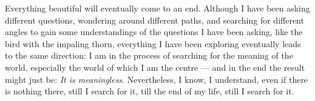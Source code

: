 \begin{center}
\vspace{-0.7em}
\vspace{-0.3em}
\end{center}

Everything beautiful will eventually come to an end. Although I have been asking different questions, wondering around different paths, and searching for different angles to gain some understandings of the questions I have been asking, like the bird with the impaling thorn, everything I have been exploring eventually leads to the same direction: I am in the process of searching for the meaning of the world, especially the world of which I am the centre --- and in the end the result might just be: \emph{It is meaningless}. Nevertheless, I know, I understand, even if there is nothing there, still I search for it, till the end of my life, still I search for it.



